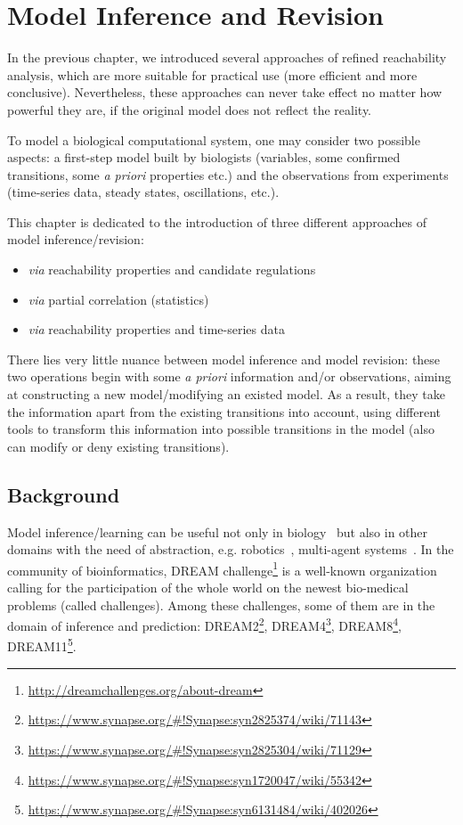 \chapter{Model Inference and Revision}\label{chap:modelInference}
\begin{mybox}
In the previous chapter, we introduced several approaches of refined reachability analysis, which are more suitable for practical use (more efficient and more conclusive).
Nevertheless, these approaches can never take effect no matter how powerful they are, if the original model does not reflect the reality.

To model a biological computational system, one may consider two possible aspects: a first-step model built by biologists (variables, some confirmed transitions, some \textit{a priori} properties etc.) and the observations from experiments (time-series data, steady states, oscillations, etc.).

This chapter is dedicated to the introduction of three different approaches of model inference/revision:

\begin{itemize}
    \item \textit{via} reachability properties and candidate regulations
    \item \textit{via} partial correlation (statistics)
    \item \textit{via} reachability properties and time-series data
\end{itemize}

There lies very little nuance between model inference and model revision: these two operations begin with some \textit{a priori} information and/or observations, aiming at constructing a new model/modifying an existed model.
As a result, they take the information apart from the existing transitions into account, using different tools to transform this information into possible transitions in the model (also can modify or deny existing transitions).

\end{mybox}

\section{Background}
Model inference/learning can be useful not only in biology~\cite{ribeiro2015learning} but also in other domains with the need of abstraction, e.g. robotics~\cite{nguyen2011model}, multi-agent systems~\cite{foerster2016learning}.
In the community of bioinformatics, DREAM  challenge\footnote{\url{http://dreamchallenges.org/about-dream}} is a well-known organization calling for the participation of the whole world on the newest bio-medical problems (called challenges). 
Among these challenges, some of them are in the domain of inference and prediction:
DREAM2\footnote{\url{https://www.synapse.org/\#!Synapse:syn2825374/wiki/71143}},
DREAM4\footnote{\url{https://www.synapse.org/\#!Synapse:syn2825304/wiki/71129}},
DREAM8\footnote{\url{https://www.synapse.org/\#!Synapse:syn1720047/wiki/55342}},
DREAM11\footnote{\url{https://www.synapse.org/\#!Synapse:syn6131484/wiki/402026}}.


